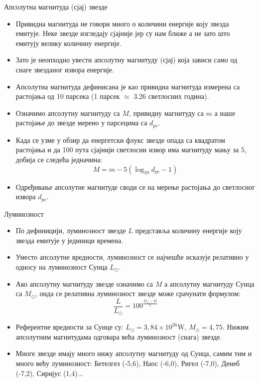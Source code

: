 \documentclass[aspectratio=169, xcolor=table, 10pt]{beamer}
\begin{document}
\begin{frame}{Апсолутна магнитуда (сјај) звезде}
  \begin{itemize}
    \item Привидна магнитуда не говори много о количини енергије коју звезда емитује\cite{wiki1}. Неке звезде изгледају сјајније јер су нам ближе а не зато што емитују велику количину енергије.
    \item Зато је неопходно увести апсолутну магнитуду (сјај) која зависи само од снаге звезданог извора енергије.
    \item Апсолутна магнитуда дефинисана је као привидна магнитуда измерена са растојања од 10 парсека (1 парсек $\approx$ 3.26 светлосних година).
    \item Означимо апсолутну магнитуду са $M$, привидну магнитуду са $m$ а наше растојање до звезде мерено у парсецима са $d_{pc}$.
    \item Када се узме у обзир да енергетски флукс звезде опада са квадратом растојања и да 100 пута сјајнији светлосни извор има магнитуду мању за 5, добија се следећа једначина:
      \begin{equation*}
        M=m-5(\log_{10}d_{pc} - 1)
      \end{equation*}
    \item Одређивање апсолутне магнитуде своди се на мерење растојања до светлосног извора $d_{pc}$.
  \end{itemize}
\end{frame}

\begin{frame}{Луминозност}
  \begin{itemize}
    \item По дефиницији, луминозност звезде $L$ представља количину енергије коју звезда емитује у јединици времена.
    \item Уместо апсолутне вредности, луминозност се најчешће исказује релативно у односу на луминозност Сунца $L_\odot$.
    \item Ако апсолутну магнитуду звезде означимо са $M$ а апсолутну магнитуду Сунца са $M_\odot$, онда се релативна луминозност звезде може срачунати формулом:
      \begin{equation*}
        \frac{L}{L_\odot} = 100^\frac{M_\odot-M}{5}
      \end{equation*}
    \item Референтне вредности за Сунце су: $L_\odot=3,84\times 10^{26}\text{W}$, $M_\odot=4,75$. Нижим апсолутним магнитудама одговара већа луминозност (снага) звезде.
    \item Многе звезде имају много нижу апсолутну магнитуду од Сунца, самим тим и много већу луминозност: Бетелгез (-5,6), Наос (-6,0), Ригел (-7,0), Денеб (-7,2), Сиријус (1,4)...
  \end{itemize}
\end{frame}
\end{document}
